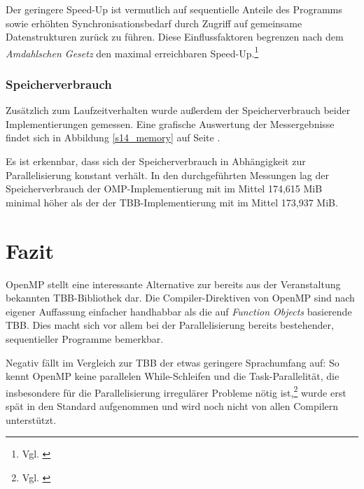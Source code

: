 \documentclass[11pt]{scrartcl}
\begin{document}
Der geringere Speed-Up ist vermutlich auf sequentielle Anteile des Programms sowie erhöhten Synchronisationsbedarf durch Zugriff auf gemeinsame Datenstrukturen zurück zu führen. Diese Einflussfaktoren begrenzen nach dem \emph{Amdahlschen Gesetz} den maximal erreichbaren Speed-Up.\footnote{Vgl. \cite[S.~318]{bengel_masterkurs_2008}}



\subsubsection{Speicherverbrauch}

Zusätzlich zum Laufzeitverhalten wurde außerdem der Speicherverbrauch beider Implementierungen gemessen. Eine grafische Auswertung der Messergebnisse findet sich in Abbildung \ref{s14_memory} auf Seite \pageref{s14_memory}.

Es ist erkennbar, dass sich der Speicherverbrauch in Abhängigkeit zur Parallelisierung konstant verhält. In den durchgeführten Messungen lag der Speicherverbrauch der OMP-Implementierung mit im Mittel 174,615 MiB minimal höher als der der TBB-Implementier\-ung mit im Mittel 173,937 MiB.

\section{Fazit}

OpenMP stellt eine interessante Alternative zur bereits aus der Veranstaltung bekannten TBB-Bibliothek dar. Die Compiler-Direktiven von OpenMP sind nach eigener Auffassung einfacher handhabbar als die auf \emph{Function Objects} basierende TBB. Dies macht sich vor allem bei der Parallelisierung bereits bestehender, sequentieller Programme bemerkbar.

Negativ fällt im Vergleich zur TBB der etwas geringere Sprachumfang auf: So kennt OpenMP keine parallelen While-Schleifen und die Task-Parallelität, die insbesondere für die Parallelisierung irregulärer Probleme nötig ist,\footnote{Vgl. \cite[S.~6]{duran_tasking_2009}} wurde erst spät in den Standard aufgenommen und wird noch nicht von allen Compilern unterstützt.
\end{document}
